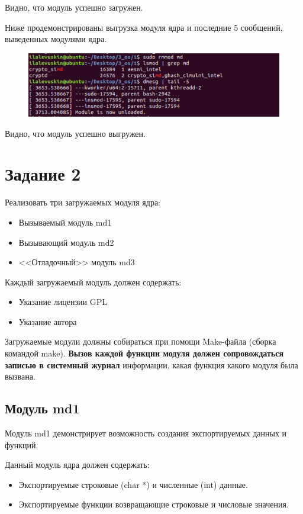 \documentclass[a4paper,12pt]{article}
\begin{document}
	Видно, что модуль успешно загружен.

	\newpage

	Ниже продемонстрированы выгрузка модуля ядра и последние 5 сообщений, выведенных модулями ядра.

	\begin{figure}[h!]
		\begin{center}
			{\includegraphics[scale = 0.7]{2.png}}
			\label{2}
		\end{center}
	\end{figure}

	Видно, что модуль успешно выгружен.
	
	
	\section*{Задание 2}
	
	Реализовать три загружаемых модуля ядра:
	\begin{itemize}
		\item Вызываемый модуль md1
		\item Вызывающий модуль md2
		\item <<Отладочный>> модуль md3
	\end{itemize}

	Каждый загружаемый модуль должен содержать:
	\begin{itemize}
		\item Указание лицензии GPL
		\item Указание автора
	\end{itemize}
	Загружаемые модули должны собираться при помощи Make-файла (сборка командой make). {\bf Вызов каждой функции модуля должен сопровождаться записью в системный журнал} информации, какая функция какого модуля была вызвана.
	
	\subsection*{Модуль md1}
	
	Модуль md1 демонстрирует возможность создания экспортируемых данных и  функций.
	
	 Данный модуль ядра должен содержать:
	\begin{itemize}
		\item Экспортируемые строковые (char *) и численные (int) данные.
		\item Экспортируемые функции возвращающие строковые и числовые значения.
	\end{itemize}
\end{document}
